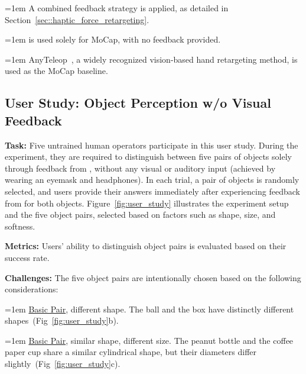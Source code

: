 \hangindent=1em
\noindent\textbullet\hspace{0.5em} A combined feedback strategy is applied, as detailed in Section~\ref{sec::haptic_force_retargeting}.

\hangindent=1em
\noindent\textbullet\hspace{0.5em} \oursystem is used solely for MoCap, with no feedback provided.

\hangindent=1em
\noindent\textbullet\hspace{0.5em} AnyTeleop~\cite{qin2023anyteleop}, a widely recognized vision-based hand retargeting method, is used as the MoCap baseline.

\subsection{User Study: Object Perception \textbf{w/o Visual Feedback}}
\label{sec::user_study}



\noindent \textbf{Task:} 
Five untrained human operators participate in this user study. During the experiment, they are required to distinguish between five pairs of objects solely through feedback from \oursystem, without any visual or auditory input (achieved by wearing an eyemask and headphones). In each trial, a pair of objects is randomly selected, and users provide their answers immediately after experiencing feedback from \oursystem for both objects.
%
Figure~\ref{fig:user_study} illustrates the experiment setup and the five object pairs, selected based on factors such as shape, size, and softness.

\noindent \textbf{Metrics:} 
Users' ability to distinguish object pairs is evaluated based on their success rate.

\noindent \textbf{Challenges:} 
The five object pairs are intentionally chosen based on the following considerations:

\hangindent=1em  
\noindent\textbullet\hspace{0.5em}{Pair 1:} \ul{Basic Pair}, different shape. The ball and the box have distinctly different shapes~(Fig~\ref{fig:user_study}b).

\hangindent=1em  
\noindent\textbullet\hspace{0.5em}{Pair 2:} \ul{Basic Pair}, similar shape, different size. The peanut bottle and the coffee paper cup share a similar cylindrical shape, but their diameters differ slightly~(Fig~\ref{fig:user_study}c).

